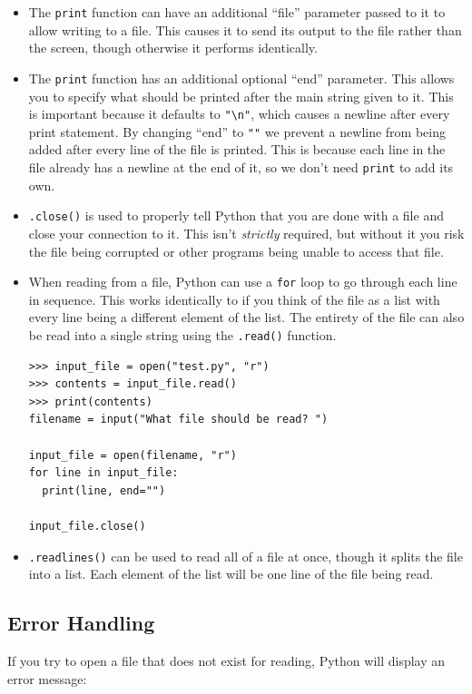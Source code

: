 \documentclass[11pt]{cselabheader}
\begin{document}
\begin{itemize}
\item The \lstinline{print} function can have an additional ``file'' parameter passed to it to allow writing to a file. This causes it to send its output to the file rather than the screen, though otherwise it performs identically.

\item The \lstinline{print} function has an additional optional ``end'' parameter. This allows you to specify what should be printed after the main string given to it. This is important because it defaults to \lstinline{"\n"}, which causes a newline after every print statement. By changing ``end'' to \lstinline{""} we prevent a newline from being added after every line of the file is printed. This is because each line in the file already has a newline at the end of it, so we don't need \lstinline{print} to add its own.

\item \lstinline{.close()} is used to properly tell Python that you are done with a file and close your connection to it. This isn't \emph{strictly} required, but without it you risk the file being corrupted or other programs being unable to access that file.

\item When reading from a file, Python can use a \lstinline{for} loop to go through each line in sequence. This works identically to if you think of the file as a list with every line being a different element of the list. The entirety of the file can also be read into a single string using the \lstinline{.read()} function.

\begin{lstlisting}[style=ipython]
>>> input_file = open("test.py", "r")
>>> contents = input_file.read()
>>> print(contents)
filename = input("What file should be read? ")

input_file = open(filename, "r")
for line in input_file:
  print(line, end="")

input_file.close()
\end{lstlisting}

\item \lstinline{.readlines()} can be used to read all of a file at once, though it splits the file into a list. Each element of the list will be one line of the file being read.
\end{itemize}


\subsection{Error Handling}
If you try to open a file that does not exist for reading, Python will display an error message:
\end{document}
